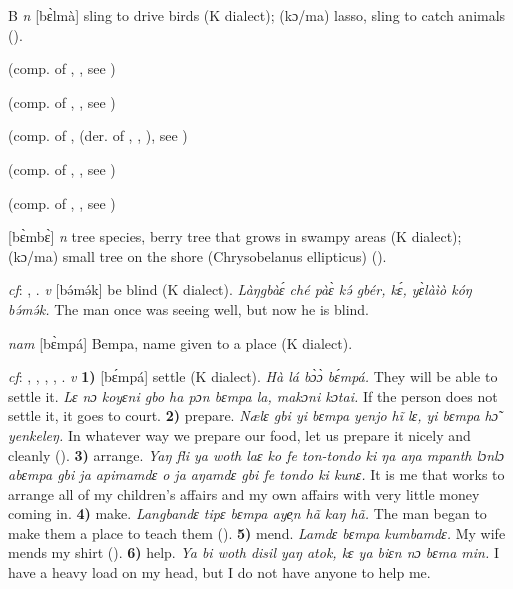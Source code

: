 \begin{letter}{B}
 \textit{n} [bɛ̀lmà] sling to drive birds (K dialect); (kɔ/ma) lasso, sling to catch animals (\citealt{Pichl1967}). 

 (comp. of , , see ) 

 (comp. of , , see ) 

 (comp. of ,  (der. of , , ), see ) 

 (comp. of , , see ) 

 (comp. of , , see ) 

 [bɛ̀mbɛ̀] \textit{n} tree species, berry tree that grows in swampy areas (K dialect); (kɔ/ma) small tree on the shore (Chrysobelanus ellipticus) (\citealt{Pichl1967}).

 \textit{cf}: , . \textit{v} [bə́mə́k] be blind (K dialect). \textit{Làŋgbàɛ́ ché pàɛ̀ kə́ gbér, kɛ́, yɛ̀làìò kóŋ bə́mə́k.} The man once was seeing well, but now he is blind.

 \textit{nam} [bɛ̀mpá] Bempa, name given to a place (K dialect). 

 \textit{cf}: , , , , . \textit{v} \textbf{1)} [bɛ́mpá] settle (K dialect). \textit{Hà lá bɔ̀ɔ̀ bɛ́mpá.} They will be able to settle it. \textit{Lɛ nɔ koyɛni gbo ha pɔn bɛmpa la, makɔni kɔtai.} If the person does not settle it, it goes to court. \textbf{2)} prepare. \textit{Nælɛ gbi yi bɛmpa yenjo hĩ lɛ, yi bɛmpa hɔ̃ yenkeleŋ.} In whatever way we prepare our food, let us prepare it nicely and cleanly (\citealt{Pichl1967}). \textbf{3)} arrange. \textit{Yaŋ fli ya woth laɛ ko fe ton-tondo ki ŋa aŋa mpanth lɔnlɔ abɛmpa gbi ja apimamdɛ o ja aŋamdɛ gbi fe tondo ki kunɛ.} It is me that works to arrange all of my children's affairs and my own affairs with very little money coming in. \textbf{4)} make. \textit{Langbandɛ tipɛ bɛmpa aye̹n hã kaŋ hã.} The man began to make them a place to teach them (\citealt{Pichl1967}). \textbf{5)} mend. \textit{Lamdɛ bɛmpa kumbamdɛ.} My wife mends my shirt (\citealt{Pichl1967}). \textbf{6)} help. \textit{Ya bi woth disil yaŋ atok, kɛ ya biɛn nɔ bɛma min.} I have a heavy load on my head, but I do not have anyone to help me.


\end{letter}
